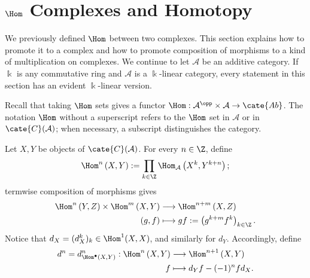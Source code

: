 
\section{\texorpdfstring{$\Hom$}{Hom} Complexes and Homotopy}\label{sec:Hom-cplx}
\hypertarget{o014.aljabr2.chapter3.hom-complex-and-homotopy}{ }

We previously defined $\Hom$ between two complexes. This section explains how
to promote it to a complex and how to promote composition of morphisms to a
kind of multiplication on complexes. We continue to let $\mathcal{A}$ be an
additive category. If $\Bbbk$ is any commutative ring and $\mathcal{A}$ is a
$\Bbbk$-linear category, every statement in this section has an evident
$\Bbbk$-linear version.

Recall that taking $\Hom$ sets gives a functor
$\Hom:\mathcal{A}^{\opp}\times\mathcal{A}\to\cate{Ab}$. The notation $\Hom$
without a superscript refers to the $\Hom$ set in $\mathcal{A}$ or in
$\cate{C}(\mathcal{A})$; when necessary, a subscript distinguishes the
category.

\begin{definition}\label{def:Hom-cplx}
	Let $X,Y$ be objects of $\cate{C}(\mathcal{A})$. For every $n\in\Z$, define
	\[ \Hom^n\left(X, Y \right) := \prod_{k \in \Z} \Hom_{\mathcal{A}}\left( X^k, Y^{k+n} \right); \]
	termwise composition of morphisms gives
	\begin{equation}\label{eqn:Hom-cplx-multiplication}\begin{aligned}
		\Hom^n \left(Y, Z \right) \times \Hom^m\left( X, Y \right) & \longrightarrow \Hom^{n+m}\left(X , Z \right) \\
		(g, f) & \longmapsto gf := \left( g^{k+m} f^k \right)_{k \in \Z}.
	\end{aligned}\end{equation}
	Notice that $d_X=(d_X^k)_k\in\Hom^1(X,X)$, and similarly for $d_Y$.
	Accordingly, define
	\begin{align*}
		d^n = d_{\Hom^\bullet(X, Y)}^n: \Hom^n\left(X, Y \right) & \longrightarrow \Hom^{n+1}\left(X, Y \right) \\
		f & \longmapsto d_Y f - (-1)^n f d_X.
	\end{align*}
\end{definition}

